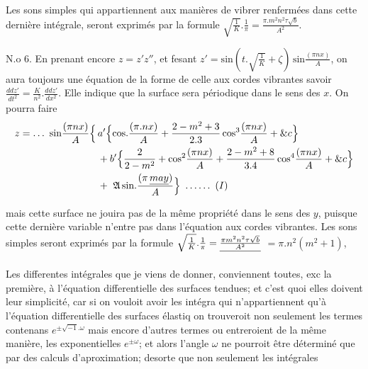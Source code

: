 \documentclass[11pt,a4paper]{article}
\begin{document}
Les sons simples qui appartiennent aux manières de vibrer renfermées dans
cette dernière intégrale, seront exprimés par la formule $\sqrt{\tfrac{1}{K}}.\frac{1}{\pi} = \frac{\pi.m^2n^2\tau\sqrt{b}}{A^2}$.

N.o 6. En prenant encore $z = z'z''$, et fesant $z' = \text{sin}(t.\sqrt{\tfrac{1}{K}}+\zeta)\,\text{sin}\frac{(\pi nx)}{A}$,
on aura toujours une équation de la forme de celle aux cordes
vibrantes savoir $\frac{ddz'}{dt^2} = \frac{K}{n^2}.\frac{ddz'}{dx^2}$. Elle indique que la surface sera
périodique dans le sens des $x$. On pourra faire
\begin{align*}
z = \ldots\ \text{sin}\frac{(\pi nx)}{A}\Bigl\{\,&a'\Bigl\{\text{cos.}\frac{(\pi.nx)}{A} + \frac{2-m^2+3}{2.3}\,\text{cos}^3\frac{(\pi nx)}{A} + \&c\Bigr\}\\
&+ b'\Bigl\{\frac{2}{2-m^2} + \text{cos}^2\frac{(\pi nx)}{A} + \frac{2-m^2+8}{3.4}\,\text{cos}^4\frac{(\pi nx)}{A} + \&c\Bigr\}\\
&+\ \mathfrak{A}\,\text{sin.}\frac{(\pi\,\uncertain{may})}{A}\Bigr\}\ \ldots\ldots\ (I)
\end{align*}

mais cette surface ne jouira pas de la même propriété dans
le sens des $y$, puisque cette dernière variable n'entre pas dans l'équation
aux cordes vibrantes. Les sons simples seront exprimés par la formule $\sqrt{\tfrac{1}{K}}.\frac{1}{\pi} = \struck{\frac{\pi m^2n^2\tau\sqrt{b}}{A^2}}$
$= \pi.n^2(m^2+1)$,

Les differentes intégrales que je viens de donner, conviennent toutes, exc
la première, à l'équation differentielle des surfaces tendues; et c'est
 quoi elles doivent leur simplicité, car si on vouloit avoir les intégra
qui n'appartiennent qu'à l'équation differentielle des surfaces élastiq
on trouveroit non seulement les termes contenans $e^{\pm\sqrt{-1}.\omega}$ mais encore
d'autres termes ou entreroient de la même manière, les exponentielles
$e^{\pm\omega}$; et alors l'angle $\omega$ ne pourroit être déterminé que par
des calculs d'aproximation; desorte que non seulement les intégrales
\end{document}
